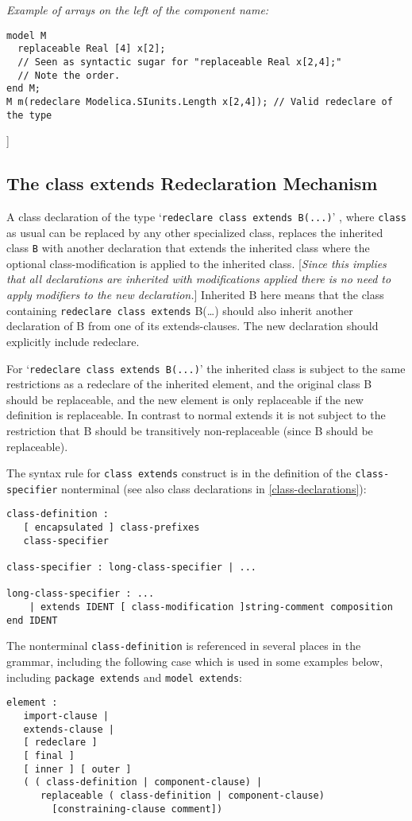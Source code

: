 \emph{Example of arrays on the left of the component name:}
\begin{lstlisting}[language=modelica]
model M
  replaceable Real [4] x[2];
  // Seen as syntactic sugar for "replaceable Real x[2,4];"
  // Note the order.
end M;
M m(redeclare Modelica.SIunits.Length x[2,4]); // Valid redeclare of the type
\end{lstlisting}

{]}

\subsection{The class extends Redeclaration Mechanism}

A class declaration of the type `\lstinline!redeclare class extends B(...)!' ,
where \lstinline!class! as usual can be replaced by any other specialized class,
replaces the inherited class \lstinline!B! with another declaration that extends the
inherited class where the optional class-modification is applied to the
inherited class. {[}\emph{Since this implies that all declarations are
inherited with modifications applied there is no need to apply modifiers
to the new declaration.}{]} Inherited B here means that the class
containing \lstinline!redeclare class extends! B(\ldots{}) should also inherit
another declaration of B from one of its extends-clauses. The new
declaration should explicitly include redeclare.

For `\lstinline!redeclare class extends B(...)!' the inherited class is subject
to the same restrictions as a redeclare of the inherited element, and
the original class B should be replaceable, and the new element is only
replaceable if the new definition is replaceable. In contrast to normal
extends it is not subject to the restriction that B should be
transitively non-replaceable (since B should be replaceable).

The syntax rule for \lstinline!class extends! construct is in the definition of the
\lstinline!class-specifier! nonterminal (see also class declarations in \autoref{class-declarations}):

\begin{lstlisting}[language=grammar]
class-definition :
   [ encapsulated ] class-prefixes
   class-specifier

class-specifier : long-class-specifier | ...

long-class-specifier : ...
    | extends IDENT [ class-modification ]string-comment composition end IDENT
\end{lstlisting}
The nonterminal \lstinline!class-definition! is referenced in several places in the
grammar, including the following case which is used in some examples
below, including \lstinline!package extends! and \lstinline!model extends!:
\begin{lstlisting}[language=grammar]
element :
   import-clause |
   extends-clause |
   [ redeclare ]
   [ final ]
   [ inner ] [ outer ]
   ( ( class-definition | component-clause) |
      replaceable ( class-definition | component-clause)
        [constraining-clause comment])
\end{lstlisting}

